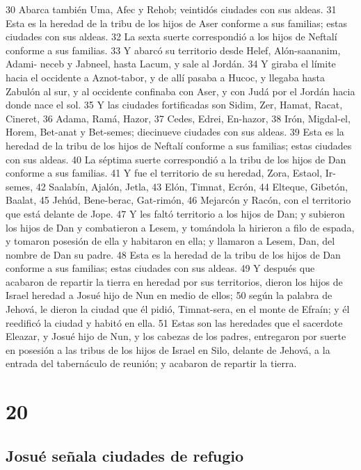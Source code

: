 30 Abarca también Uma, Afec y Rehob; veintidós ciudades con sus aldeas.
31 Esta es la heredad de la tribu de los hijos de Aser conforme a sus familias; estas ciudades con sus aldeas.
32 La sexta suerte correspondió a los hijos de Neftalí conforme a sus familias.
33 Y abarcó su territorio desde Helef, Alón-saananim, Adami- neceb y Jabneel, hasta Lacum, y sale al Jordán.
34 Y giraba el límite hacia el occidente a Aznot-tabor, y de allí pasaba a Hucoc, y llegaba hasta Zabulón al sur, y al occidente confinaba con Aser, y con Judá por el Jordán hacia donde nace el sol.
35 Y las ciudades fortificadas son Sidim, Zer, Hamat, Racat, Cineret,
36 Adama, Ramá, Hazor,
37 Cedes, Edrei, En-hazor,
38 Irón, Migdal-el, Horem, Bet-anat y Bet-semes; diecinueve ciudades con sus aldeas.
39 Esta es la heredad de la tribu de los hijos de Neftalí conforme a sus familias; estas ciudades con sus aldeas.
40 La séptima suerte correspondió a la tribu de los hijos de Dan conforme a sus familias.
41 Y fue el territorio de su heredad, Zora, Estaol, Ir-semes,
42 Saalabín, Ajalón, Jetla,
43 Elón, Timnat, Ecrón,
44 Elteque, Gibetón, Baalat,
45 Jehúd, Bene-berac, Gat-rimón,
46 Mejarcón y Racón, con el territorio que está delante de Jope.
47 Y les faltó territorio a los hijos de Dan; y subieron los hijos de Dan y combatieron a Lesem, y tomándola la hirieron a filo de espada, y tomaron posesión de ella y habitaron en ella; y llamaron a Lesem, Dan, del nombre de Dan su padre. 
48 Esta es la heredad de la tribu de los hijos de Dan conforme a sus familias; estas ciudades con sus aldeas. 
49 Y después que acabaron de repartir la tierra en heredad por sus territorios, dieron los hijos de Israel heredad a Josué hijo de Nun en medio de ellos;
50 según la palabra de Jehová, le dieron la ciudad que él pidió, Timnat-sera, en el monte de Efraín; y él reedificó la ciudad y habitó en ella.
51 Estas son las heredades que el sacerdote Eleazar, y Josué hijo de Nun, y los cabezas de los padres, entregaron por suerte en posesión a las tribus de los hijos de Israel en Silo, delante de Jehová, a la entrada del tabernáculo de reunión; y acabaron de repartir la tierra. 

\chapter{20}

\section*{Josué señala ciudades de refugio}

